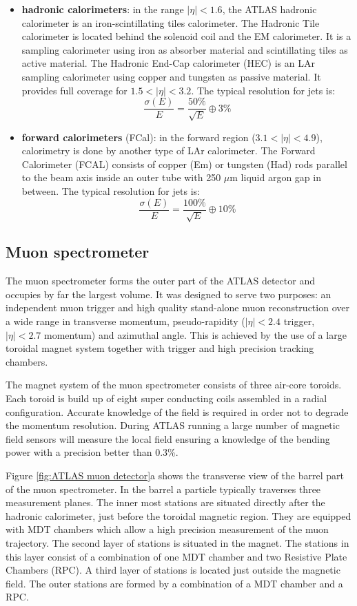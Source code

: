 \documentclass[a4paper, oneside]{book}
\begin{document}
\begin{itemize}
\begin{table}[h!]
						\end{table}
										
						\item \textbf{hadronic calorimeters}:
						in the range $|\eta|<1.6$, the ATLAS hadronic calorimeter is an iron-scintillating tiles calorimeter. The Hadronic Tile calorimeter is located behind the solenoid coil and the EM calorimeter. It is a sampling calorimeter using iron as absorber material and scintillating tiles as active material. The Hadronic End-Cap calorimeter (HEC) is an LAr sampling calorimeter using copper and tungsten as passive material. It provides full coverage for $1.5<|\eta|<3.2$. The typical resolution for jets is:
						$$ 
						\frac{\sigma(E)}{E} = \frac{50\%}{\sqrt{E}} \oplus 3\%
						$$
						\item \textbf{forward calorimeters} (FCal):
						in the forward region ($3.1<|\eta|<4.9$), calorimetry is done by another type of LAr calorimeter. The Forward Calorimeter (FCAL) consists of copper (Em) or tungsten (Had) rods parallel to the beam axis inside an outer tube with 250 $\mu$m liquid argon gap in between. The typical resolution for jets is:
						$$ 
						\frac{\sigma(E)}{E} = \frac{100\%}{\sqrt{E}} \oplus 10\%
						$$
					\end{itemize}
		
		
				\subsection{Muon spectrometer}
					\cite{Muon system}The  muon  spectrometer  forms  the  outer  part  of  the  ATLAS  detector  and occupies by far the largest volume. It was designed to serve two purposes: an independent muon trigger and high quality stand-alone muon reconstruction over a wide range in transverse momentum, pseudo-rapidity ($|\eta|<2.4$ trigger, $|\eta|<2.7$ momentum) and azimuthal angle. This is achieved by the use of a large toroidal magnet system together with trigger and high precision tracking chambers.
					
					The magnet system of the muon spectrometer consists of three air-core toroids. Each toroid is build up of eight super conducting coils assembled in a radial configuration. Accurate knowledge of the field is required in order not to degrade the momentum resolution. During ATLAS running a large number of magnetic field sensors will measure the local field ensuring a knowledge of the bending power with a precision better than 0.3\%. 
					
					Figure \ref{fig:ATLAS muon detector}a shows the transverse view of the barrel part of the muon spectrometer. In the barrel a particle typically traverses three measurement planes. The inner most stations are situated directly after the hadronic calorimeter, just before the toroidal magnetic region. They are equipped with MDT chambers which allow a high precision measurement of the muon trajectory. The second layer of stations is situated in the magnet. The stations in this layer consist of a combination of one MDT chamber and two Resistive Plate Chambers (RPC). A third layer of stations is located just outside the magnetic field. The outer stations are formed by a combination of a MDT chamber and a RPC.
					
\end{document}
